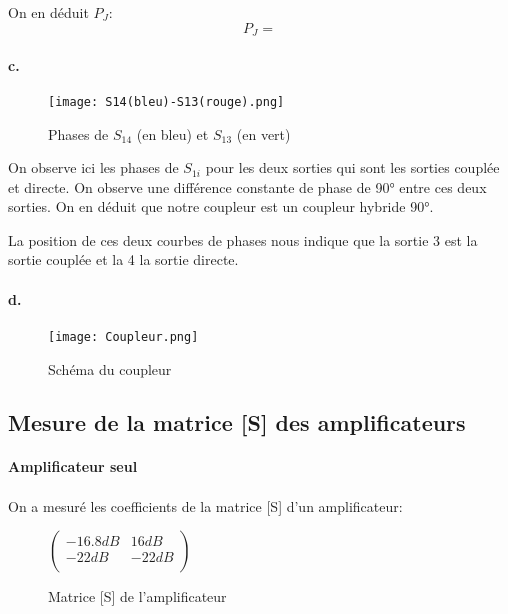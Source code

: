 \documentclass[oneside,a4paper,12pt]{article}
\begin{document}
	On en déduit $ P_{J} $:
	\[ P_{J} =  \]

	\paragraph{c.}
	\begin{figure}
		\centering
		\texttt{[image: S14(bleu)-S13(rouge).png]}
		\caption{Phases de $S_{14}$ (en bleu) et $S_{13}$ (en vert)}
	\end{figure}

	On observe ici les phases de $S_{1i}$ pour les deux sorties qui sont les sorties couplée et directe.
	On observe une différence constante de phase de 90° entre ces deux sorties. On en déduit que notre coupleur est un coupleur hybride 90°. 

	La position de ces deux courbes de phases nous indique que la sortie 3 est la sortie couplée et la 4 la sortie directe.

	\paragraph{d.}
	\paragraph{}
	\begin{figure}[h]
		\centering
		\texttt{[image: Coupleur.png]}
		\caption{Schéma du coupleur}		
	\end{figure}

	\subsection{Mesure de la matrice [S] des amplificateurs}
	\paragraph{Amplificateur seul} \paragraph{}
	On a mesuré les coefficients de la matrice [S] d'un amplificateur:
	\begin{figure}[h]
		\centering
		$
		\begin{pmatrix}
			-16.8 dB & 16 dB \\
			-22 dB & -22 dB \\
		\end{pmatrix}
		$
		\caption{Matrice [S] de l'amplificateur}
	\end{figure}
\end{document}
